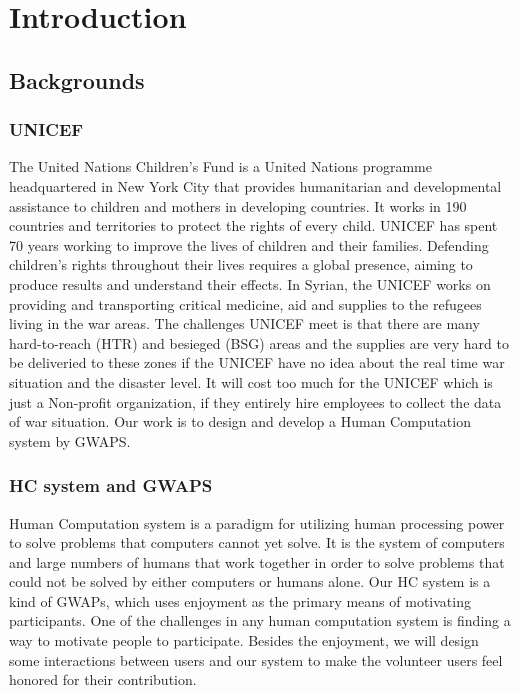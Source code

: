 \section{Introduction}

\subsection{Backgrounds}

\subsubsection{UNICEF}
  The United Nations Children's Fund\cite{unicef1994state} is a United Nations programme headquartered
  in New York City that provides humanitarian and developmental assistance to 
  children and mothers in developing countries. 
  It works in 190 countries and territories to protect the rights of every child. 
  UNICEF has spent 70 years working to improve the lives of children and their families. 
  Defending children's rights throughout their lives requires a global presence, 
  aiming to produce results and understand their effects. 
  In Syrian, the UNICEF works on providing and transporting critical medicine, 
  aid and supplies to the refugees living in the war areas. The challenges UNICEF meet is that 
  there are many hard-to-reach (HTR) and besieged (BSG) areas and the supplies are 
  very hard to be deliveried to these zones if the UNICEF have no idea about 
  the real time war situation and the disaster level. It will cost too much for the UNICEF 
  which is just a Non-profit organization, if they entirely hire employees to 
  collect the data of war situation. 
  Our work is to design and develop a Human Computation system by GWAPS\cite{lafourcade2015games}.

  \subsubsection{HC system and GWAPS}
  Human Computation system is a paradigm for utilizing human processing power to solve problems that 
  computers cannot yet solve\cite{quinn2011human}. 
  It is the system of computers and large numbers of humans that work together in order to solve problems that 
  could not be solved by either computers or humans alone\cite{quinn2009taxonomy}.
  Our HC system is a kind of GWAPs, which uses enjoyment as the primary means of motivating participants. 
  One of the challenges in any human computation system is finding a way to motivate people 
  to participate\cite{quinn2011human}. 
  Besides the enjoyment, we will design some interactions between users and our system to 
  make the volunteer users feel honored for their contribution.

